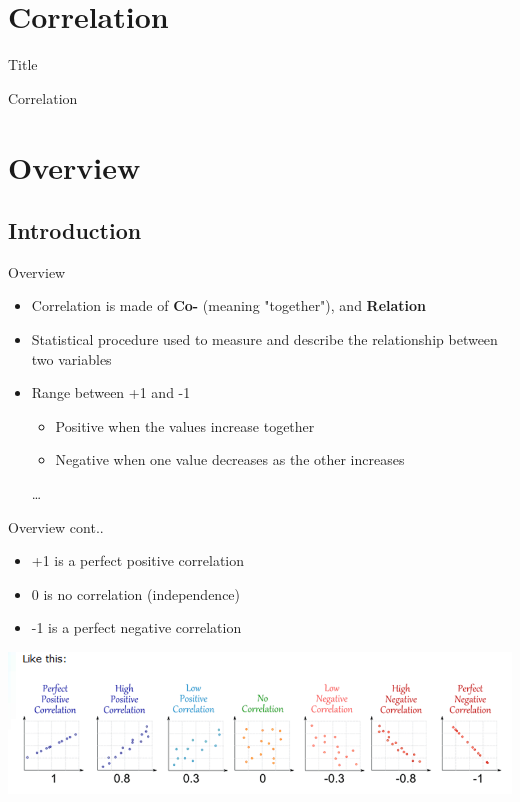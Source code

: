 \documentclass[slidestop,compress,14pt,xcolor=dvipsnames]{beamer}\usepackage[]{graphicx}\usepackage[]{color}
\author{Ken Mwai}
\institute{Pwani-University R WorkShop}
\begin{document}
\section{Correlation}
\begin{frame}{Title}
\vspace*{\fill}
\begin{center}
Correlation
\end{center}
\vspace*{\fill}
\end{frame}

\section{Overview}
\subsection{Introduction}
\begin{frame}{Overview}
\begin{itemize}
    \item  Correlation is made of {\bf Co- } (meaning "together"), and {\bf Relation }
    \item Statistical procedure used to measure and describe the relationship between two variables 
    \item Range between +1 and -1
      \begin{itemize}
        \item Positive when the values increase together
        \item Negative when one value decreases as the other increases 
      \end{itemize}
\ldots
\end{itemize}
\end{frame}
\begin{frame}{Overview cont..}
\begin{itemize}
  \item +1 is a perfect positive correlation
  \item 0 is no correlation (independence)
  \item -1 is a perfect negative correlation
\end{itemize}
\includegraphics[scale=0.5]{corelation}
\end{frame}
\end{document}
